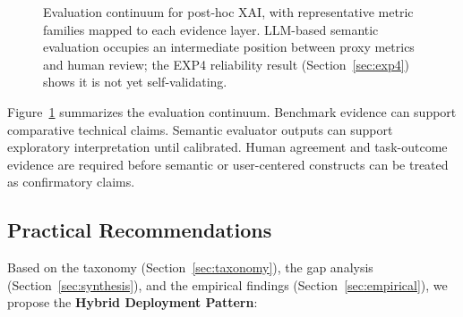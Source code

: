 \documentclass[10pt,a4paper,twoside]{article}
\begin{document}
\begin{figure}[t]
\caption{Evaluation continuum for post-hoc XAI, with representative metric
families mapped to each evidence layer. LLM-based semantic evaluation
occupies an intermediate position between proxy metrics and human
review; the EXP4 reliability result (Section~\ref{sec:exp4})
shows it is not yet self-validating.}
\label{fig:continuum}
\end{figure}

Figure~\ref{fig:continuum} summarizes the evaluation continuum. Benchmark
evidence can support comparative technical claims. Semantic evaluator
outputs can support exploratory interpretation until calibrated. Human
agreement and task-outcome evidence are required before semantic or
user-centered constructs can be treated as confirmatory claims.

\subsection{Practical Recommendations}
\label{sec:recommendations}

Based on the taxonomy (Section~\ref{sec:taxonomy}), the gap analysis
(Section~\ref{sec:synthesis}), and the empirical findings
(Section~\ref{sec:empirical}), we propose the \textbf{Hybrid Deployment
Pattern}:
\end{document}
